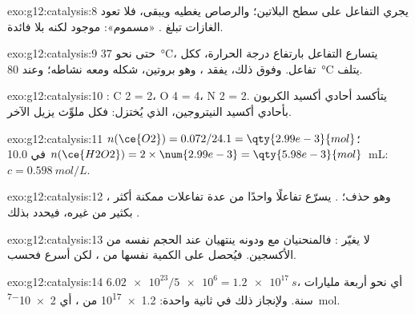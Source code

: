 \begin{solution}{exo:g12:catalysis:8}
يجري التفاعل على سطح البلاتين؛ والرصاص يغطيه
ويبقى، فلا تعود الغازات تبلغ . 
«مسموم»: موجود لكنه بلا فائدة.
\end{solution}

\begin{solution}{exo:g12:catalysis:9}
حتى نحو \qty{37}{\celsius}، يتسارع التفاعل بارتفاع
درجة الحرارة، ككل تفاعل. وفوق ذلك، يفقد ، وهو بروتين،
شكله ومعه نشاطه؛ وعند \qty{80}{\celsius} يتلف.
\end{solution}

\begin{solution}{exo:g12:catalysis:10}
: C 2 = 2، O 4 = 4، N 2 = 2. يتأكسد أحادي أكسيد
الكربون بأحادي أكسيد النيتروجين، الذي يُختزل: فكل ملوِّث يزيل
الآخر.
\end{solution}

\begin{solution}{exo:g12:catalysis:11}
$n(\ce{O2}) = 0.072 / 24.1 = \qty{2.99e-3}{mol}$؛
$n(\ce{H2O2}) = 2 \times \num{2.99e-3} = \qty{5.98e-3}{mol}$ في
\qty{10.0}{mL}: $c = \qty{0.598}{mol/L}$.
\end{solution}

\begin{solution}{exo:g12:catalysis:12}
، وهو حذف؛ .
 يسرّع تفاعلًا واحدًا من عدة تفاعلات ممكنة أكثر بكثير
من غيره، فيحدد بذلك .
\end{solution}

\begin{solution}{exo:g12:catalysis:13}
لا يغيّر  : فالمنحنيان مع 
ودونه ينتهيان عند الحجم نفسه من الأكسجين. فيُحصل على الكمية نفسها من
، لكن أسرع فحسب.
\end{solution}

\begin{solution}{exo:g12:catalysis:14}
$\num{6.02e23} / \num{5e6} = \qty{1.2e17}{s}$، أي نحو أربعة مليارات سنة.
ولإنجاز ذلك في ثانية واحدة: \num{1.2e17}  من ، أي
\qty{2e-7}{mol}.
\end{solution}

